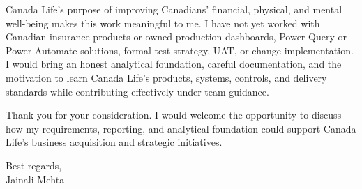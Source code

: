 \documentclass[letterpaper,11pt]{article}
\begin{document}
\bigbreak
Canada Life's purpose of improving Canadians' financial, physical, and mental well-being makes this work meaningful to me. I have not yet worked with Canadian insurance products or owned production dashboards, Power Query or Power Automate solutions, formal test strategy, UAT, or change implementation. I would bring an honest analytical foundation, careful documentation, and the motivation to learn Canada Life's products, systems, controls, and delivery standards while contributing effectively under team guidance.

\bigbreak
Thank you for your consideration. I would welcome the opportunity to discuss how my requirements, reporting, and analytical foundation could support Canada Life's business acquisition and strategic initiatives.

\bigbreak
Best regards,\\
Jainali Mehta
\end{document}
